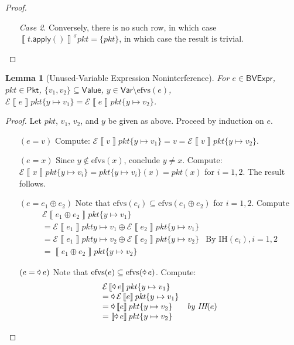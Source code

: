 \documentclass{article}
\newcommand{\pkt}{\mathit{pkt}}
\newcommand{\denote}[1]{\left\llbracket#1\right\rrbracket}
\newcommand{\edenote}[1]{\mathcal{E}\denote{#1}}
\newcommand{\binop}{\mathbin{\oplus}}
\newcommand{\unop}{\mathop{\text{\pointer}}}
\newcommand{\Value}{\mathsf{Value}}
\newcommand{\BVExpr}{\mathsf{BVExpr}}
\newcommand{\Pkt}{\mathsf{Pkt}}
\newcommand{\Var}{\mathsf{Var}}
\newcommand{\apply}{\mathsf{apply}}
\newcommand{\efvs}{\textrm{efvs}}
\newtheorem{lemma}{Lemma}
\begin{document}
\begin{proof}
\begin{enumerate}[align=left]
\begin{enumerate}[align=left]
    \item[\textit{Case 2}.] Conversely, there is no such row, in which case
      $\denote{t.\apply()}^\sigma\pkt = \{\pkt\}$, in which case the result is
      trivial.
    \end{enumerate}
  \end{enumerate}
\end{proof}

\begin{lemma}[Unused-Variable Expression Noninterference]
  \label{lem:exp-param-noninter}
  For $e \in \BVExpr$, $\pkt \in \Pkt$,
  $\{v_1,v_2\} \subseteq \Value$, $y \in \Var \setminus \efvs(e) $,
  $\edenote{e}\pkt\{y \mapsto v_1\} = \edenote{e}pkt\{y \mapsto v_2\}$.
\end{lemma}
\begin{proof}
  Let $\pkt$, $v_1$, $v_2$, and $y$ be given as above. Proceed by induction on
  $e$.
  \begin{enumerate}[align=left]
    \item[$(e = v)$] Compute: $\edenote{v}\pkt\{y
      \mapsto v_1\} = v = \edenote{v}pkt\{y \mapsto v_2\}$.
    \item[$(e = x)$] Since $y \not\in \efvs(x)$, conclude $y \neq x$. Compute:
      $\edenote{x}\pkt\{y \mapsto v_i\} = \pkt\{y \mapsto v_i\}(x) = \pkt(x) $
      for $i = 1,2$. The result follows.

    \item[$(e = e_1 \binop e_2)$]
      Note that $\efvs(e_i) \subseteq \efvs(e_1 \binop e_2)$ for $i = 1,2$. Compute
      \[\begin{array}{ll}
      \edenote{e_1 \binop e_2}\pkt\{y \mapsto v_1\} \\
      = \edenote{e_1}\pkt{y \mapsto v_1} \binop \edenote{e_2}\pkt\{y \mapsto v_1\} \\
      = \edenote{e_1}\pkt{y \mapsto v_2} \binop \edenote{e_2}\pkt\{y \mapsto v_2\} & \text{By IH}(e_i), i = 1,2\\
      = \denote{e_1 \binop e_2}\pkt\{y \mapsto v_2\}
      \end{array}
      \]

    \item[$(e = \unop e)$]
      Note that $\efvs(e) \subseteq \efvs(\unop e)$. Compute:
      \[\begin{array}{ll}
      \edenote{\unop e}\pkt\{y \mapsto v_1\} \\
      = \unop \edenote{e}\pkt\{y \mapsto v_1\} \\
      = \unop \denote{e}\pkt\{y \mapsto v_2\} & \textit{by IH}(e)\\
      = \denote{\unop e}\pkt\{y \mapsto v_2\}
      \end{array}\]
  \end{enumerate}
\end{proof}
\end{document}
